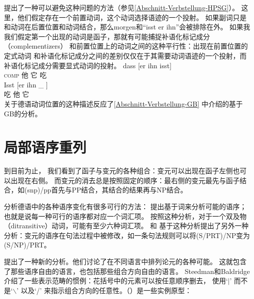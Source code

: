 \zl
 \citet{KW91a}提出了一种可以避免这种问题的方法（参见\ref{Abschnitt-Verbstellung-HPSG}）。
这里，他们假定存在一个前置动词，这个动词选择语迹的一个投射。
如果副词只是和动词在后置位置和动词结合，那么morgen和“isst er ihn”会被排除在外。
如果我我们假定第一个出现的动词是函子，那就有可能捕捉补语化标记成分（complementizers）
和前置位置上的动词之间的这种平行性\citep{Hoehle97a}：出现在前置位置的定式动词
和补语化标记成分之间的差别仅仅在于其需要动词语迹的一个投射，而补语化标记成分需要显式动词的投射。
\eal
\ex 
\gll dass [er ihn isst]\\
     \textsc{comp} \spacebr{}他 它 吃\\
\ex 
\gll Isst [er ihn \_ ]\\
     吃 \spacebr{}他 它 \\
\zl
关于德语动词位置的这种描述反应了\ref{Abschnitt-Verbstellung-GB}
中介绍的基于GB的分析。

\section{局部语序重列}
\label{Abschnitt-CG-lokale-Umstellung}

到目前为止，
我们看到了函子与变元的各种组合：变元可以出现在函子左侧也可以出现在右侧。
而变元的消去总是按照固定的顺序：最右侧的变元最先与函子结合，如(s\bs np)/pp首先与PP结合，其结合的结果再与NP结合。 

分析德语中的各种语序变化有很多可行的方法：
 \citet{Uszkoreit86b}提出基于词来分析可能的语序；也就是说每一种可行的语序都对应一个词汇项。
按照这种分析，对于一个双及物（ditransitive）动词，可能有至少六种词汇项。
 \citet[]{Briscoe2000a}和 \citet[--98]{Villavicencio2002a}基于这种分析提出了另外一种分析：变元的语序在句法过程中被修改，如一条句法规则可以将(S/PRT)/NP变为(S/NP)/PRT。

 \citet{SB2006a-u}提出了一种新的分析。他们讨论了在不同语言中排列论元的各种可能。
这就包含了那些语序自由的语言，也包括那些组合方向自由的语言。
Steedman和Baldridge介绍了一些表示范畴的惯例：花括号中的元素可以按任意顺序删去，
使用`$|$'
\isc{$\vert$}\is{$\vert$}而不是`$\backslash$'
\isc{$\backslash$}\is{$\backslash$}以及`/'
\isc{/}\is{/}来指示组合方向的任意性。（）是一些实例原型：

